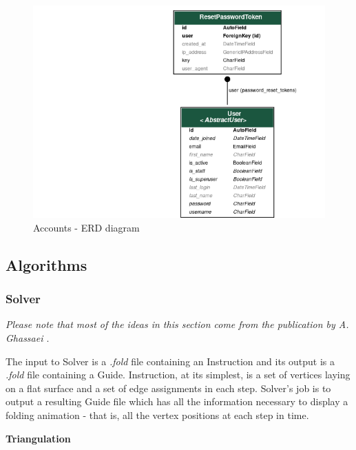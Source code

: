  
\begin{figure}[H]
  \caption{Accounts - ERD diagram}
  \centering
    \includegraphics[width=\textwidth]{assets/3-erd-accounts.png}
\end{figure}




\subsection{Algorithms}

\subsubsection{Solver}
\label{section:algorithms-Solver}

\textit{Please note that most of the ideas in this section come from the publication by A. Ghassaei \cite{origami-simulator:paper}}.
\smallskip

The input to Solver is a \textit{.fold} file containing an Instruction and its output is a \textit{.fold} file containing a Guide. 
Instruction, at its simplest, is a set of vertices laying on a flat surface and a set of edge assignments in each step.
Solver's job is to output a resulting Guide file which has all the information necessary to display
a folding animation - that is, all the vertex positions at each step in time.

\smallskip
\textbf{Triangulation}
\smallskip

